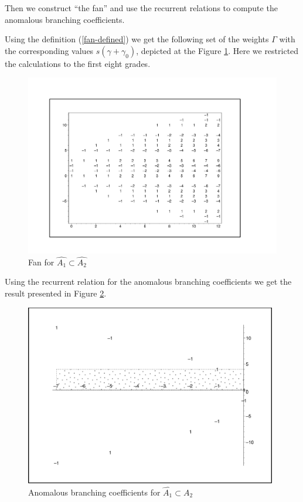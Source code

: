 \documentclass[a4paper,12pt]{article}
\theoremstyle{definition} \newtheorem{Def}{Definition}
\begin{document}
Then we construct ``the fan'' and use the recurrent relations to compute the anomalous branching coefficients.

Using the definition (\ref{fan-defined}) we get the following set of
the weights $\Gamma$ with the corresponding values $s(\gamma+\gamma_0)$, depicted at the Figure \ref{fig:AffineA2A1Fan}.
Here we restricted the calculations to the first eight grades.
\begin{figure}[p]
  \centering
  \includegraphics[width=130mm]{AffineA2_A1_fan.pdf}
  \caption{Fan for $\hat{A_1}\subset \hat{A_2}$}
  \label{fig:AffineA2A1Fan}
\end{figure}

Using the recurrent relation for the anomalous branching coefficients we get the result presented in Figure \ref{fig:AffineA2_A1_branching}. 
\begin{figure}[ph]
  \centering
  \includegraphics[width=110mm]{AffineA2_A1_branching.pdf}
  \caption{Anomalous branching coefficients for $\hat{A_1}\subset \hat{A_2}$}
  \label{fig:AffineA2_A1_branching}
\end{figure}
\end{document}
